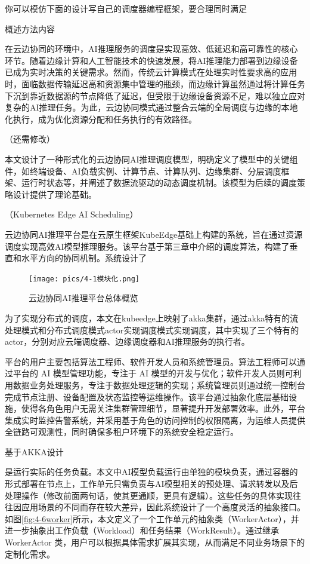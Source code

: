 你可以模仿下面的设计写自己的调度器编程框架，要合理同时满足


概述方法内容

在云边协同的环境中，AI推理服务的调度是实现高效、低延迟和高可靠性的核心环节。随着边缘计算和人工智能技术的快速发展，将AI推理能力部署到边缘设备已成为实时决策的关键需求。然而，传统云计算模式在处理实时性要求高的应用时，面临数据传输延迟高和资源集中管理的瓶颈，而边缘计算虽然通过将计算任务下沉到靠近数据源的节点降低了延迟，但受限于边缘设备资源不足，难以独立应对复杂的AI推理任务。为此，云边协同模式通过整合云端的全局调度与边缘的本地化执行，成为优化资源分配和任务执行的有效路径。

（还需修改）


    
    本文设计了一种形式化的云边协同AI推理调度模型，明确定义了模型中的关键组件，如终端设备、AI负载实例、计算节点、计算队列、边缘集群、分层调度框架、运行时状态等，并阐述了数据流驱动的动态调度机制。该模型为后续的调度策略设计提供了理论基础。

（Kubernetes Edge AI Scheduling）



云边协同AI推理平台是在云原生框架KubeEdge基础上构建的系统，旨在通过资源调度实现高效AI模型推理服务。该平台基于第三章中介绍的调度算法，构建了垂直和水平方向的协同机制。系统设计了

\begin{figure}[ht]
  \centering
  \texttt{[image: pics/4-1模块化.png]}
  \caption{云边协同AI推理平台总体概览}
  \label{fig:4-1modules}
\end{figure}

为了实现分布式的调度，本文在kubeedge上映射了akka集群，通过akka特有的流处理模式和分布式调度模式actor实现调度模式实现调度，其中实现了三个特有的actor，分别对应云端调度器、边缘调度器和AI推理服务的执行者。

平台的用户主要包括算法工程师、软件开发人员和系统管理员。算法工程师可以通过平台的 AI 模型管理功能，专注于 AI 模型的开发与优化；软件开发人员则可利用数据业务处理服务，专注于数据处理逻辑的实现；系统管理员则通过统一控制台完成节点注册、设备配置及状态监控等运维操作。该平台通过抽象化底层基础设施，使得各角色用户无需关注集群管理细节，显著提升开发部署效率。此外，平台集成实时监控告警系统，并采用基于角色的访问控制的权限隔离，为运维人员提供全链路可观测性，同时确保多租户环境下的系统安全稳定运行。

基于AKKA设计




是运行实际的任务负载。本文中AI模型负载运行由单独的模块负责，通过容器的形式部署在节点上，工作单元只需负责与AI模型相关的预处理、请求转发以及后处理操作（修改前面两句话，使其更通顺，更具有逻辑）。这些任务的具体实现往往因应用场景的不同而存在较大差异，因此系统设计了一个高度灵活的抽象接口。如图\ref{fig:4-6worker}所示，本文定义了一个工作单元的抽象类（WorkerActor），并进一步抽象出工作负载（Workload）和任务结果（WorkResult）。通过继承 WorkerActor 类，用户可以根据具体需求扩展其实现，从而满足不同业务场景下的定制化需求。

